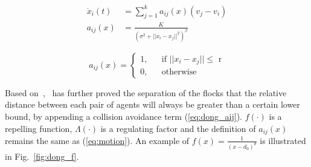 \begin{equation}\label{eq:motion}
\begin{aligned}
\ddot{x}_i(t)&=\sum^k_{j=1}a_{ij}(x)(v_j-v_i)\\
a_{ij}(x)&=\frac{K}{(\sigma^2+||x_i-x_j||^2)^{\beta}}
\end{aligned}
\end{equation}

\begin{equation}\label{eq:vicsek_aij}
a_{ij}(x)=\left\{\begin{array}{rcl}
1, & & \text{if $||x_i-x_j||\leq$ r}\\
0, & & \text{otherwise}
\end{array} \right.
\end{equation}

Based on~\cite{CuckerSmale2007},~\cite{CuckerDong2010} has further proved the separation of the flocks that the relative distance between each pair of agents will always be greater than a certain lower bound, by appending a collision avoidance term (\ref{eq:dong_aij}). $f(\cdot)$ is a repelling function, $\Lambda(\cdot)$ is a regulating factor and the definition of $a_{ij}(x)$ remains the same as (\ref{eq:motion}). An example of $f(x)=\frac{1}{(x-d_0)^{\theta}}$ is illustrated in Fig.~\ref{fig:dong_f}.

